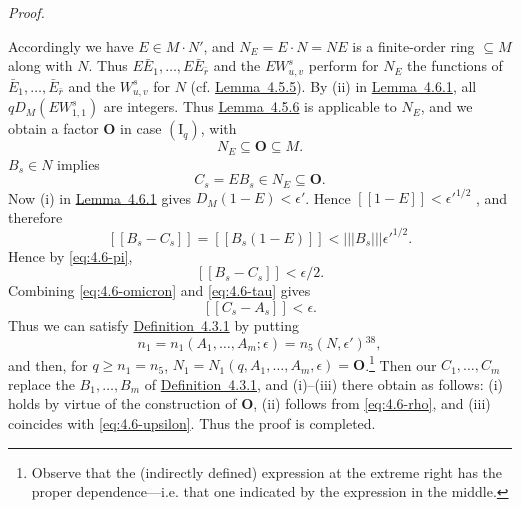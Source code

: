 \documentclass[b5paper,twoside]{article}
\newcommand{\lemref}[2]{\hyperref[#1]{\mbox{Lemma~#2}}}
\newcommand{\defref}[2]{\hyperref[#1]{\mbox{Definition~#2}}}
\theoremstyle{mvnplain}
\renewenvironment{proof}[1][Proof]{%
  \par\addvspace{0.35\baselineskip}%
  \noindent\textit{#1.}\ \normalfont\ignorespaces
}{%
  \par\addvspace{0.35\baselineskip}%
}
\newcommand{\M}{\mathbf M}
\newcommand{\N}{\mathbf N}
\newcommand{\Metric}[1]{\left[\!\left[#1\right]\!\right]}
\newcommand{\OpNorm}[1]{\left\lvert\left\lvert\left\lvert#1\right\rvert\right\rvert\right\rvert}
\def\M{M}%
\def\N{N}%
\def\Metric#1{[[#1]]}%
\begin{document}
\begin{proof}
Accordingly we have \(E\in\M\mathbin{\cdot}\N'\), and
\(\N_E=E\mathbin{\cdot}\N=\N E\) is a finite-order ring \(\subseteq\M\)
along with \(\N\). Thus \(E\bar E_1,\ldots,E\bar E_{\bar r}\) and the
\(EW^s_{u,v}\) perform for \(\N_E\) the functions of
\(\bar E_1,\ldots,\bar E_{\bar r}\) and the \(W^s_{u,v}\) for \(\N\)
(cf. \lemref{lem:4.5.5}{4.5.5}). By (ii) in \lemref{lem:4.6.1}{4.6.1}, all
\(qD_{\M}(EW^s_{1,1})\) are integers. Thus \lemref{lem:4.5.6}{4.5.6} is
applicable to \(\N_E\), and we obtain a factor \(\mathbf O\) in case
\((\mathrm I_q)\), with
\begin{equation}\tag{4.6.\(\rho\)}\label{eq:4.6-rho}
 \N_E\subseteq\mathbf O\subseteq\M.
\end{equation}
\(B_s\in\N\) implies
\begin{equation}\tag{4.6.\(\sigma\)}\label{eq:4.6-sigma}
 C_s=EB_s\in\N_E\subseteq\mathbf O.
\end{equation}
Now (i) in \lemref{lem:4.6.1}{4.6.1} gives
\(D_{\M}(1-E)<\epsilon'\). Hence
\(\Metric{1-E}<\epsilon'^{1/2}\)\hspace{0.08em}%
, and therefore
\[
 \Metric{B_s-C_s}=\Metric{B_s(1-E)}
 <\OpNorm{B_s}\epsilon'^{1/2}.
\]
Hence by \eqref{eq:4.6-pi},
\begin{equation}\tag{4.6.\(\tau\)}\label{eq:4.6-tau}
 \Metric{B_s-C_s}<\epsilon/2.
\end{equation}
Combining \eqref{eq:4.6-omicron} and \eqref{eq:4.6-tau} gives
\begin{equation}\tag{4.6.\(\upsilon\)}\label{eq:4.6-upsilon}
 \Metric{C_s-A_s}<\epsilon.
\end{equation}
Thus we can satisfy \defref{def:4.3.1}{4.3.1} by putting
\[
 n_1=n_1(A_1,\ldots,A_m;\epsilon)=n_5(\N,\epsilon')
 {}^{\hyperref[fn:38]{38}},
\]
and then, for \(q\geq n_1=n_5\),
\(\N_1=\N_1(q,A_1,\ldots,A_m,\epsilon)=\mathbf O\).\footnote{\label{fn:38}Observe
that the (indirectly defined) expression at the extreme right has the proper
dependence---i.e. that one indicated by the expression in the middle.} Then our
\(C_1,\ldots,C_m\) replace the \(B_1,\ldots,B_m\) of
\defref{def:4.3.1}{4.3.1}, and (i)--(iii) there obtain as follows: (i) holds by
virtue of the construction of \(\mathbf O\), (ii) follows from
\eqref{eq:4.6-rho}, and (iii) coincides with \eqref{eq:4.6-upsilon}. Thus the
proof is completed.
\end{proof}
\end{document}
